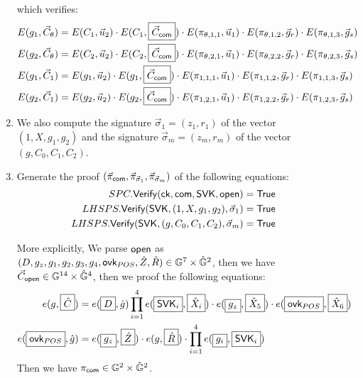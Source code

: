 \begin{description}
\begin{enumerate}
    which verifies:
    \begin{align*}
      E(g_1, \vec{C}_{\theta}) &= E(C_1, \vec{u}_2) \cdot E(C_1, \boxed{\vec{C}_{\mathsf{com}}}) \cdot E(\pi_{\theta,1,1}, \vec{u}_1) \cdot E(\pi_{\theta,1,2}, \vec{g}_r) \cdot E(\pi_{\theta,1,3}, \vec{g}_s)\\
      E(g_2, \vec{C}_{\theta}) &= E(C_2, \vec{u}_2) \cdot E(C_2, \boxed{\vec{C}_{\mathsf{com}}}) \cdot E(\pi_{\theta,2,1}, \vec{u}_1) \cdot E(\pi_{\theta,2,2}, \vec{g}_r) \cdot E(\pi_{\theta,2,3}, \vec{g}_s)\\
      E(g_1, \vec{C}_{1}) &= E(g_1, \vec{u}_2) \cdot E(g_1, \boxed{\vec{C}_{\mathsf{com}}}) \cdot E(\pi_{1,1,1}, \vec{u}_1) \cdot E(\pi_{1,1,2}, \vec{g}_r) \cdot E(\pi_{1,1,3}, \vec{g}_s)\\
      E(g_2, \vec{C}_{1}) &= E(g_2, \vec{u}_2) \cdot E(g_2, \boxed{\vec{C}_{\mathsf{com}}}) \cdot E(\pi_{1,2,1}, \vec{u}_1) \cdot E(\pi_{1,2,2}, \vec{g}_r) \cdot E(\pi_{1,2,3}, \vec{g}_s)
    \end{align*}
  \item We also compute the signature $\vec{\sigma}_1 = (z_1, r_1)$ of the vector $(1, X, g_1, g_2)$ and the signature $\vec{\sigma}_m = (z_m, r_m)$ of the vector $(g, C_0, C_1, C_2)$.
  \item Generate the proof $(\vec{\pi}_{\mathsf{com}}, \vec{\pi}_{\vec{\sigma}_1}, \vec{\pi}_{\vec{\sigma}_m})$ of the following equations:
    \begin{align*}
      SPC.{\mathsf{Verify}}(\mathsf{ck}, \mathsf{com}, \mathsf{SVK}, \mathsf{open}) &= \mathsf{True}\\
      LHSPS.{\mathsf{Verify}}(\mathsf{SVK}, (1, X, g_1, g_2), \vec{\sigma}_1) &= \mathsf{True}\\
      LHSPS.{\mathsf{Verify}}(\mathsf{SVK}, (g, C_0, C_1, C_2), \vec{\sigma}_m) &= \mathsf{True}\\
    \end{align*}
    
    More explicitly, We parse $\mathsf{open}$ as $(D, g_z, g_1, g_2, g_3, g_4, \mathsf{ovk}_{POS}, \hat{Z}, \hat{R}) \in \mathbb{G}^7 \times \hat{\mathbb{G}}^2$, then we have $\vec{C}_{\mathsf{open}} \in \mathbb{G}^{14} \times \hat{\mathbb{G}}^4$, then we proof the following equations:
    \begin{align*}
      e(g, \boxed{\hat{C}}) &= e(\boxed{D}, \hat{g}) \prod_{i = 1}^{4} e(\boxed{\mathsf{SVK}_i}, \boxed{\hat{X}_i}) \cdot e(\boxed{g_z}, \boxed{\hat{X}_5}) \cdot e(\boxed{\mathsf{ovk}_{POS}}, \boxed{\hat{X}_6}) \\
      e(\boxed{\mathsf{ovk}_{POS}}, \hat{g}) &= e(\boxed{g_z}, \boxed{\hat{Z}}) \cdot e(g, \boxed{\hat{R}}) \cdot \prod_{i = 1}^4 e(\boxed{g_i}, \boxed{\mathsf{SVK}_i}) 
    \end{align*}
    Then we have $\pi_{\mathsf{com}} \in \mathbb{G}^2 \times \hat{\mathbb{G}}^2$.


\end{enumerate}
\end{description}
